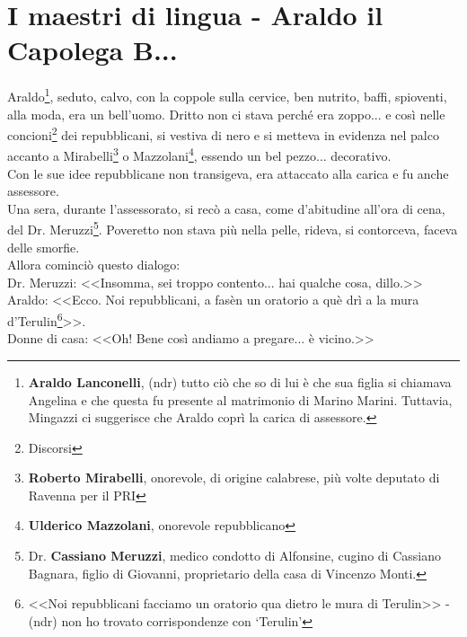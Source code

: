 %
\chapter{I maestri di lingua - Araldo il Capolega B...}
Araldo\footnote{\textbf{Araldo Lanconelli}, (ndr) tutto ciò che so di lui è che sua figlia si chiamava Angelina e che questa fu presente al matrimonio di Marino Marini. Tuttavia, Mingazzi ci suggerisce che Araldo coprì la carica di assessore.}, seduto, calvo, con la coppole sulla cervice, ben nutrito, baffi, spioventi, alla moda, era un bell'uomo. Dritto non ci stava perché era zoppo... e così nelle concioni\footnote{Discorsi} dei repubblicani, si vestiva di nero e si metteva in evidenza nel palco accanto a Mirabelli\footnote{\textbf{Roberto Mirabelli}, onorevole, di origine calabrese, più volte deputato di Ravenna per il PRI} o Mazzolani\footnote{\textbf{Ulderico Mazzolani}, onorevole repubblicano}, essendo un bel pezzo... decorativo.\\
\indent Con le sue idee repubblicane non transigeva, era attaccato alla carica e fu anche assessore.\\
\indent Una sera, durante l'assessorato, si recò a casa, come d'abitudine all'ora di cena, del Dr. Meruzzi\footnote{Dr. \textbf{Cassiano Meruzzi}, medico condotto di Alfonsine, cugino di Cassiano Bagnara, figlio di Giovanni, proprietario della casa di Vincenzo Monti.}. Poveretto non stava più nella pelle, rideva, si contorceva, faceva delle smorfie.\\
\indent Allora cominciò questo dialogo:\\
\indent Dr. Meruzzi: <<Insomma, sei troppo contento... hai qualche cosa, dillo.>>\\
\indent {}Araldo: <<Ecco. Noi repubblicani, a fasèn un oratorio a què drì a la mura d'Terulin\footnote{<<Noi repubblicani facciamo un oratorio qua dietro le mura di Terulin>> - (ndr) non ho trovato corrispondenze con `Terulin'}>>.\\
\indent Donne di casa: <<Oh! Bene così andiamo a pregare... è vicino.>>\\

